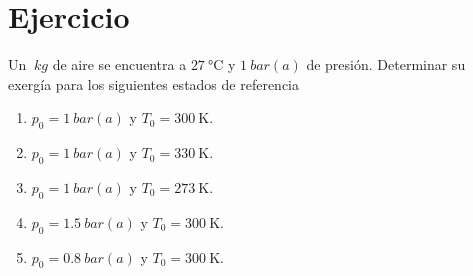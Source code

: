 \section{Ejercicio}\label{ej:Chap08Ejercicio08}
Un $\SI{}{kg}$ de aire se encuentra a $\SI{27}{\celsius}$ y $\SI{1}{bar(a)}$ de presión. Determinar su exergía para los siguientes estados de referencia
\begin{multicols}{2}
\begin{enumerate}
    \item $p_0=\SI{1}{bar(a)}$ y $T_0=\SI{300}{\kelvin}$.
    \item $p_0=\SI{1}{bar(a)}$ y $T_0=\SI{330}{\kelvin}$.
    \item $p_0=\SI{1}{bar(a)}$ y $T_0=\SI{273}{\kelvin}$.
    \item $p_0=\SI{1.5}{bar(a)}$ y $T_0=\SI{300}{\kelvin}$.
    \item $p_0=\SI{0.8}{bar(a)}$ y $T_0=\SI{300}{\kelvin}$.
\end{enumerate}
\vspace{0pt plus 1filll}\mbox{}
\end{multicols}